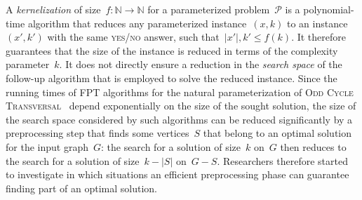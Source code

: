 
A \emph{kernelization} of size~$f \colon \mathbb{N} \to \mathbb{N}$ for a parameterized problem~$\mathcal{P}$ is a polynomial-time algorithm that reduces any parameterized instance~$(x,k)$ to an instance~$(x',k')$ with the same \textsc{yes/no} answer, such that~$|x'|, k' \leq f(k)$. It therefore guarantees that the size of the instance is reduced in terms of the complexity parameter~$k$. It does not directly ensure a reduction in the \emph{search space} of the follow-up algorithm that is employed to solve the reduced instance. Since the running times of FPT algorithms for the natural parameterization of \textsc{Odd Cycle Transversal}~\cite{Huffner09,ReedSV04,LokshtanovNRRS14} depend exponentially on the size of the sought solution, the size of the search space considered by such algorithms can be reduced significantly by a preprocessing step that finds some vertices~$S$ that belong to an optimal solution for the input graph~$G$: the search for a solution of size~$k$ on~$G$ then reduces to the search for a solution of size~$k-|S|$ on~$G-S$. Researchers therefore started to investigate in which situations an efficient preprocessing phase can guarantee finding part of an optimal solution. 

